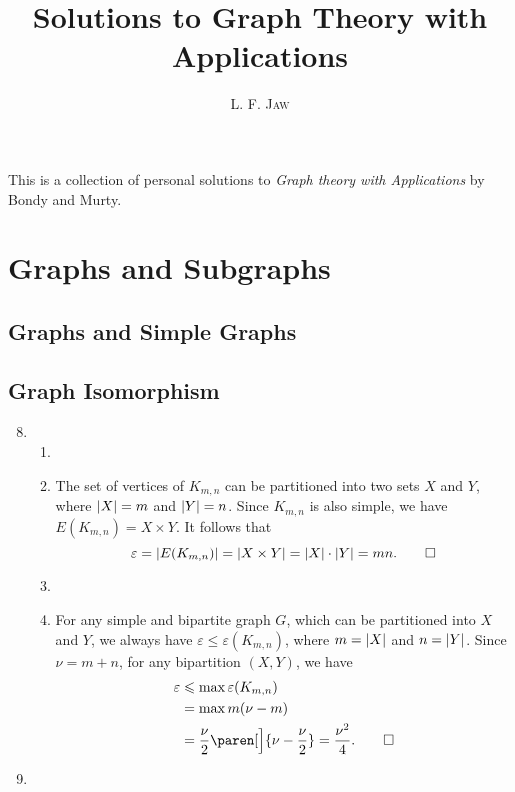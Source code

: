 \documentclass[a4paper]{book}
\title{Solutions to Graph Theory with Applications}
\author{L. F. \textsc{Jaw}}
\makeatletter
\renewenvironment{proof}[1][\proofname]{\par
  \pushQED{\qed}%
  \normalfont \topsep6\p@\@plus6\p@\relax
  \trivlist
  \item[]\ignorespaces
}{%
  \popQED\endtrivlist\@endpefalse
}
\makeatother
\begin{document}
\frontmatter
\maketitle

This is a collection of personal solutions to \textit{Graph theory
  with Applications} by Bondy and Murty.

\mainmatter

\chapter{Graphs and Subgraphs}
\label{chap:1}

\section{Graphs and Simple Graphs}
\label{sec:1.1}

\section{Graph Isomorphism}
\label{sec:1.2}

\begin{enumerate}
  \setcounter{enumi}{7}
\item
  \begin{enumerate}
  \item
    \begin{proof}
      The set of vertices of \(K_{m,n}\) can be partitioned into two
      sets \(X\) and \(Y\), where \(\lvert X\rvert = m\) and \(\lvert Y\rvert = n\).
      Since \(K_{m,n}\) is also simple, we have
      \(E(K_{m,n}) = X \times Y\).  It follows that
      \[
        \varepsilon = \lvert E(K_{m,n})\rvert = \lvert X \times Y\rvert = \lvert X\rvert \cdot \lvert Y\rvert = mn. \qedhere
      \]
  \end{proof}
    
  \item
    \begin{proof}
      For any simple and bipartite graph \(G\), which can be
      partitioned into \(X\) and \(Y\), we always have
      \(\varepsilon \le \varepsilon(K_{m,n})\), where \(m = \lvert X\rvert\)
      and \(n = \lvert Y\rvert\).  Since \(\nu = m+n\), for any bipartition
      \((X, Y)\), we have
      \begin{align*}
        \varepsilon &\le \max \varepsilon(K_{m,n}) \\
                    &= \max m(\nu-m) \\
                    &= \frac{\nu}{2} \paren[\Big]{\nu - \frac{\nu}{2}}
                      = \frac{\nu^2}{4}. \qedhere
      \end{align*}
    \end{proof}
  \end{enumerate}
  
\item 
\end{enumerate}

\newpage
\null
\end{document}
